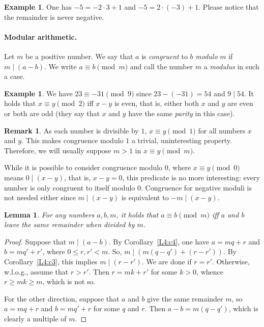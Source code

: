 \documentclass[12pt,notitlepage]{article}
\theoremstyle{plain}
\newtheorem{lemma}[thm]{Lemma}
\theoremstyle{definition}
\newtheorem{exm}[thm]{Example}
\newtheorem{rem}[thm]{Remark}
\theoremstyle{plain}
\newcommand{\1}{\mathbf{1}}
\newcommand{\0}{\mathbf{0}}
\newcommand{\dvd}{\mathop{\mid}}
\newcommand{\mcomm}[1]{}
\begin{document}
\begin{exm}
One has $-5 = -2 \cdot 3 + 1$ and $-5 = 2 \cdot (-3) + 1$. Please notice that the remainder is never negative.
\end{exm}

\paragraph{Modular arithmetic.}

Let $m$ be a positive number. We say that $a$ is \emph{congruent} to $b$ \emph{modulo} $m$ if $m \dvd (a - b)$.  We write $a \equiv b \pmod m$ and call the number $m$ a \emph{modulus} in such a case.

\begin{exm}
We have $23 \equiv -31 \pmod 9$ since $23 - (-31) = 54$ and $9 \dvd 54$. It holds that $x \equiv y \pmod 2$ iff $x - y$ is even, that is, either both $x$ and $y$ are even or both are odd (they say that $x$ and $y$ have the same \emph{parity} in this case).
\end{exm}

\begin{rem}
As each number is divisible by $1$, $x \equiv y \pmod 1$ for all numbers $x$ and $y$. This makes congruence modulo $1$ a trivial, uninteresting property. Therefore, we will usually suppose $m > 1$ in $x \equiv y \pmod m$.

While it is possible to consider congruence modulo $0$, where $x \equiv y \pmod 0$ means $0 \dvd (x - y)$, that is, $x - y = 0$, this predicate is no more interesting: every number is only congruent to itself modulo $0$. Congruence for negative moduli is not needed either since $m \dvd (x - y)$ is equivalent to $-m \dvd (x - y)$.
\end{rem}

\mcomm{In practice, we also used simplified notation $a \equiv b\ (m)$ as well. Many students are already familiar with this concept but prefer to define it in terms of remainders. The Instructor should underline that each of these two equivalent definitions may be preferable to the other one in various situations.}

\begin{lemma}\label{L4:l5}
For any numbers $a, b, m$, it holds that $a \equiv b \pmod m$ iff $a$ and $b$ leave the same remainder when divided by $m$.
\end{lemma}
\begin{proof}
Suppose that $m \dvd (a - b)$. By Corollary~\ref{L4:c4}, one have $a = m q + r$ and $b = m q' + r'$, where $0 \leq r, r' < m$. So, $m \dvd (m(q - q') + (r - r'))$. By Corollary~\ref{L4:c3}, this implies $m \dvd (r - r')$. We are done if $r = r'$. Otherwise, w.l.o.g., assume that $r > r'$. Then $r = mk + r'$ for some $k > 0$, whence $r \geq mk \geq m$, which is not so.

For the other direction, suppose that $a$ and $b$ give the same remainder $m$, so $a = m q + r$ and $b = m q' + r$ for some $q$ and $r$. Then $a - b = m(q - q')$, which is clearly a multiple of $m$.
\end{proof}
\end{document}
